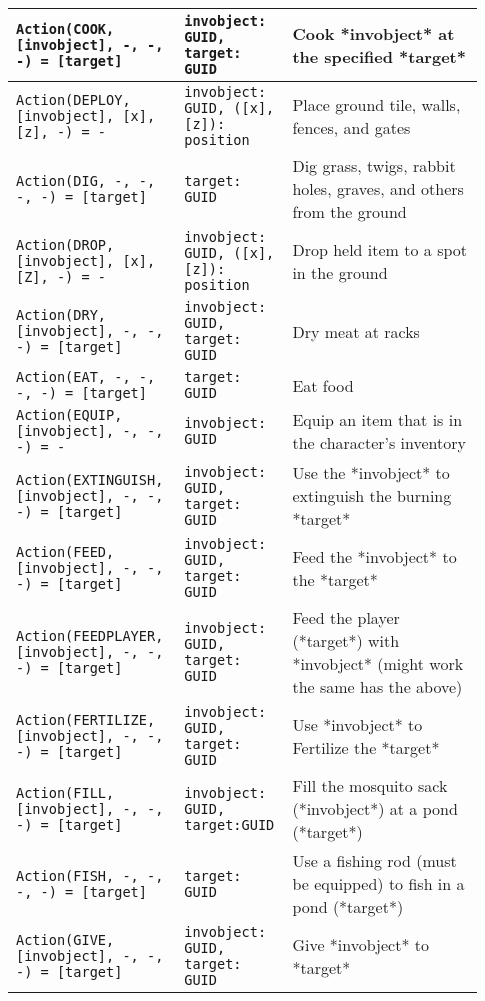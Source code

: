 \begin{table}[htb]
{\begin{longtable}{ | p{0.35\linewidth} | p{0.18\linewidth} | p{0.4\linewidth} | }
		\texttt{Action(COOK, [invobject], -, -, -) = [target]} & \texttt{{invobject: GUID, target: GUID}} & Cook *invobject* at the specified *target* \\ \hline 
		\texttt{Action(DEPLOY, [invobject], [x], [z], -) = -} & \texttt{{invobject: GUID, ([x], [z]): position}} & Place ground tile, walls, fences, and gates \\ \hline 
		\texttt{Action(DIG, -, -, -, -) = [target]} & \texttt{{target: GUID}} & Dig grass, twigs, rabbit holes, graves, and others from the ground \\ \hline 
		\texttt{Action(DROP, [invobject], [x], [Z], -) = -} & \texttt{{invobject: GUID, ([x], [z]): position}} & Drop held item to a spot in the ground \\ \hline 
		\texttt{Action(DRY, [invobject], -, -, -) = [target]} & \texttt{{invobject: GUID, target: GUID}} & Dry meat at racks \\ \hline 
		\texttt{Action(EAT, -, -, -, -) = [target]} & \texttt{{target: GUID}} & Eat food \\ \hline 
		\texttt{Action(EQUIP, [invobject], -, -, -) = -} & \texttt{{invobject: GUID}} & Equip an item that is in the character's inventory \\ \hline 
		\texttt{Action(EXTINGUISH, [invobject], -, -, -) = [target]} & \texttt{{invobject: GUID, target: GUID}} & Use the *invobject* to extinguish the burning *target* \\ \hline 
		\texttt{Action(FEED, [invobject], -, -, -) = [target]} & \texttt{{invobject: GUID, target: GUID}} & Feed the *invobject* to the *target* \\ \hline 
		\texttt{Action(FEEDPLAYER, [invobject], -, -, -) = [target]} & \texttt{{invobject: GUID, target: GUID}} & Feed the player (*target*) with *invobject* (might work the same has the above) \\ \hline 
		\texttt{Action(FERTILIZE, [invobject], -, -, -) = [target]} & \texttt{{invobject: GUID, target: GUID}} & Use *invobject* to Fertilize the *target* \\ \hline 
		\texttt{Action(FILL, [invobject], -, -, -) = [target]} & \texttt{{invobject: GUID}, target:GUID} & Fill the mosquito sack (*invobject*) at a pond (*target*) \\ \hline 
		\texttt{Action(FISH, -, -, -, -) = [target]} & \texttt{{target: GUID}} & Use a fishing rod (must be equipped) to fish in a pond (*target*) \\ \hline 
		\texttt{Action(GIVE, [invobject], -, -, -) = [target]} & \texttt{{invobject: GUID, target: GUID}} & Give *invobject* to *target* \\ \hline 

\end{longtable}}
\end{table}
